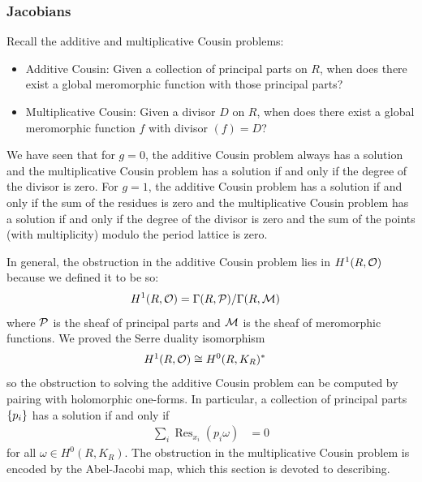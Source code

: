 \documentclass[12pt]{article}
\begin{document}
\subsubsection{Jacobians}

Recall the additive and multiplicative Cousin problems:
\begin{itemize}
    \item Additive Cousin: Given a collection of principal parts on $R$, when does there exist a global meromorphic function with those principal parts?
    \item Multiplicative Cousin: Given a divisor $D$ on $R$, when does there exist a global meromorphic function $f$ with divisor $(f) = D$?
\end{itemize}
We have seen that for $g=0$, the additive Cousin problem always has a solution and the multiplicative Cousin problem has a solution if and only if the degree of the divisor is zero. For $g = 1$, the additive Cousin problem has a solution if and only if the sum of the residues is zero and the multiplicative Cousin problem has a solution if and only if the degree of the divisor is zero and the sum of the points (with multiplicity) modulo the period lattice is zero.

In general, the obstruction in the additive Cousin problem lies in $H^1(R, {\mathcal{O}})$ because we defined it to be so:
\begin{align*}
    H^1(R, {\mathcal{O}}) & = \Gamma(R, {\mathcal{P}}) / \Gamma(R, {\mathcal{M}})
\end{align*} where ${\mathcal{P}}$ is the sheaf of principal parts and ${\mathcal{M}}$ is the sheaf of meromorphic functions. We proved the Serre duality isomorphism \begin{align*}
    H^1(R, {\mathcal{O}}) & \cong H^0(R, K_R)^*
\end{align*} so the obstruction to solving the additive Cousin problem can be computed by pairing with holomorphic one-forms. In particular, a collection of principal parts $\{p_i\}$ has a solution if and only if \begin{align*}
    \sum_i \operatorname{Res}_{x_i}(p_i \omega) & = 0
\end{align*} for all $\omega \in H^0(R, K_R)$.
The obstruction in the multiplicative Cousin problem is encoded by the Abel-Jacobi map, which this section is devoted to describing.
\end{document}
